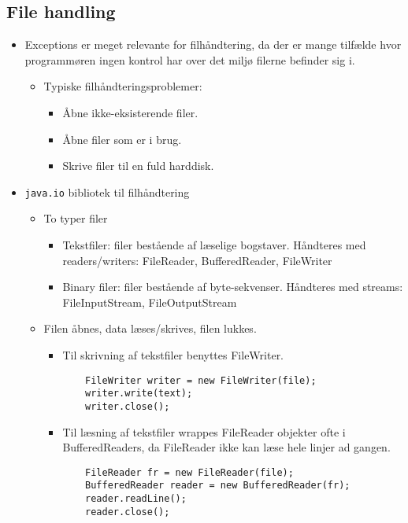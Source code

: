 \subsection{File handling}
\begin{itemize}
  \item Exceptions er meget relevante for filhåndtering, da der er mange tilfælde hvor programmøren ingen kontrol har over det miljø filerne befinder sig i.
  \begin{itemize}
    \item Typiske filhåndteringsproblemer:
    \begin{itemize}
      \item Åbne ikke-eksisterende filer.
      \item Åbne filer som er i brug.
      \item Skrive filer til en fuld harddisk.
    \end{itemize}
  \end{itemize}
  \item \verb|java.io| bibliotek til filhåndtering
  \begin{itemize}
    \item To typer filer
    \begin{itemize}
      \item Tekstfiler: filer bestående af læselige bogstaver. Håndteres med readers/writers: FileReader, BufferedReader, FileWriter
      \item Binary filer: filer bestående af byte-sekvenser. Håndteres med streams: FileInputStream, FileOutputStream
    \end{itemize}  
    \item Filen åbnes, data læses/skrives, filen lukkes.
    \begin{itemize}
      \item Til skrivning af tekstfiler benyttes FileWriter.
        \begin{verbatim}
    FileWriter writer = new FileWriter(file);
    writer.write(text);
    writer.close();
        \end{verbatim}
      \item Til læsning af tekstfiler wrappes FileReader objekter ofte i BufferedReaders, da FileReader ikke kan læse hele linjer ad gangen.
        \begin{verbatim}
    FileReader fr = new FileReader(file);
    BufferedReader reader = new BufferedReader(fr);
    reader.readLine();
    reader.close();
        \end{verbatim}
    \end{itemize}

\end{itemize}
\end{itemize}
